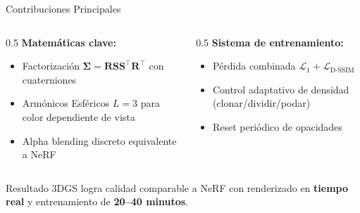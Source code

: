 \begin{frame}{Contribuciones Principales}
  \begin{columns}
    \begin{column}{0.5\textwidth}
      \textbf{Matemáticas clave:}
      \begin{itemize}
        \item Factorización $\boldsymbol{\Sigma} = \mathbf{RSS}^\top\mathbf{R}^\top$ con cuaterniones
        \item Armónicos Esféricos $L=3$ para color dependiente de vista
        \item Alpha blending discreto equivalente a NeRF
      \end{itemize}
    \end{column}
    \begin{column}{0.5\textwidth}
      \textbf{Sistema de entrenamiento:}
      \begin{itemize}
        \item Pérdida combinada $\mathcal{L}_1 + \mathcal{L}_{\text{D-SSIM}}$
        \item Control adaptativo de densidad (clonar/dividir/podar)
        \item Reset periódico de opacidades
      \end{itemize}
    \end{column}
  \end{columns}
  \vspace{1em}
  \begin{exampleblock}{Resultado}
    3DGS logra calidad comparable a NeRF con renderizado en \textbf{tiempo real} y entrenamiento de \textbf{20--40 minutos}.
  \end{exampleblock}
\end{frame}

